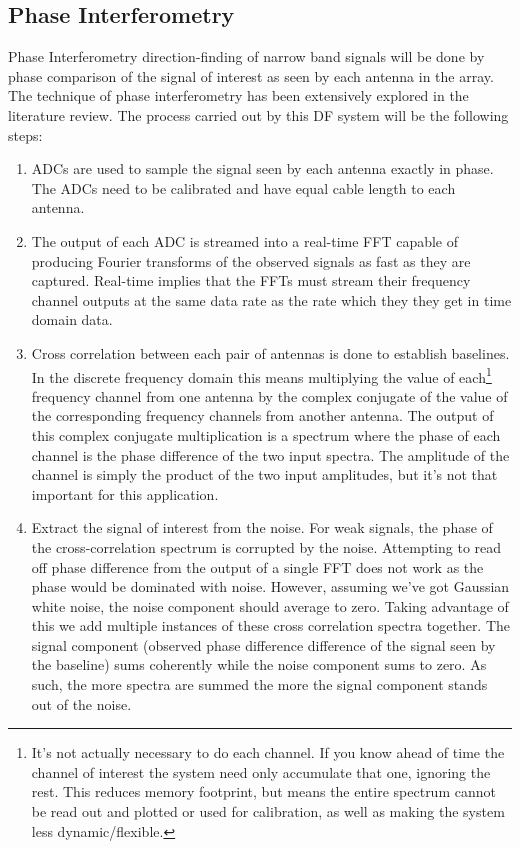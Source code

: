 \subsection{Phase Interferometry}
Phase Interferometry direction-finding of narrow band signals will be done by phase comparison of the signal of interest as seen by each antenna in the array. The technique of phase interferometry has been extensively explored in the literature review. The process carried out by this DF system will be the following steps:
\begin{enumerate}
  \item ADCs are used to sample the signal seen by each antenna exactly in phase. The ADCs need to be calibrated and have equal cable length to each antenna.
  \item The output of each ADC is streamed into a real-time FFT capable of producing Fourier transforms of the observed signals as fast as they are captured. Real-time implies that the FFTs must stream their frequency channel outputs at the same data rate as the rate which they they get in time domain data.
  \item Cross correlation between each pair of antennas is done to establish baselines. In the discrete frequency domain this means multiplying the value of each\footnote{It's not actually necessary to do each channel. If you know ahead of time the channel of interest the system need only accumulate that one, ignoring the rest. This reduces memory footprint, but means the entire spectrum cannot be read out and plotted or used for calibration, as well as making the system less dynamic/flexible.} frequency channel from one antenna by the complex conjugate of the value of the corresponding frequency channels from another antenna. The output of this complex conjugate multiplication is a spectrum where the phase of each channel is the phase difference of the two input spectra. The amplitude of the channel is simply the product of the two input amplitudes, but it's not that important for this application.
  \item Extract the signal of interest from the noise. For weak signals, the phase of the cross-correlation spectrum is corrupted by the noise. Attempting to read off phase difference from the output of a single FFT does not work as the phase would be dominated with noise. However, assuming we've got Gaussian white noise, the noise component should average to zero. Taking advantage of this we add multiple instances of these cross correlation spectra together. The signal component (observed phase difference difference of the signal seen by the baseline) sums coherently while the noise component sums to zero. As such, the more spectra are summed the more the signal component stands out of the noise.

\end{enumerate}
